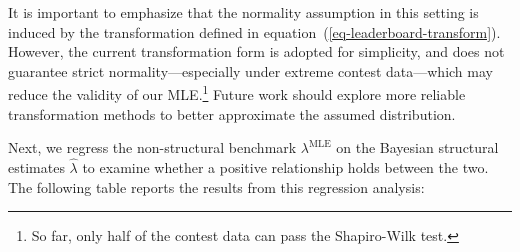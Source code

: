 \documentclass[mnsc]{informs3}
\begin{document}
It is important to emphasize that the normality assumption in this setting is induced by the transformation defined in equation~(\ref{eq-leaderboard-transform}). 
However, the current transformation form is adopted for simplicity, and does not guarantee strict normality—especially under extreme contest data—which may reduce the validity of our MLE.\footnote{So far, only half of the contest data can pass the Shapiro-Wilk test. }
Future work should explore more reliable transformation methods to better approximate the assumed distribution.

Next, we regress the non-structural benchmark $\lambda^{\text{MLE}}$ on the Bayesian structural estimates $\hat\lambda$ to examine whether a positive relationship holds between the two.
The following table reports the results from this regression analysis: 
\end{document}
